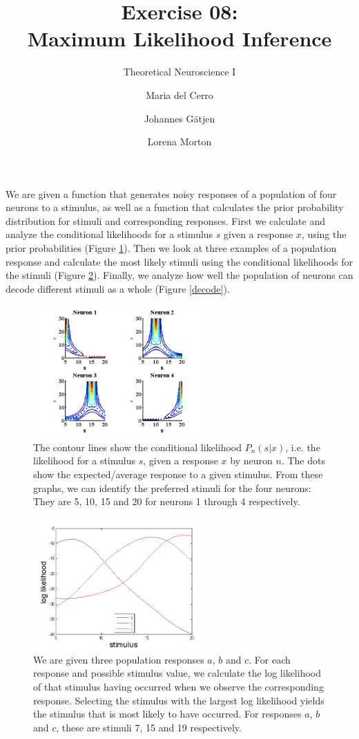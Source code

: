 \documentclass{scrartcl}
\title{Exercise 08:\\Maximum Likelihood Inference}
\subtitle{Theoretical Neuroscience I}
\author{Maria del Cerro \and Johannes G\"atjen \and Lorena Morton}
\begin{document}
\maketitle

We are given a function that generates noisy responses of a population of four neurons to a stimulus, as well as a function that calculates the prior probability distribution for stimuli and corresponding responses. First we calculate and analyze the conditional likelihoods for a stimulus $s$ given a response $x$, using the prior probabilities (Figure \ref{cond}). Then we look at three examples of a population response and calculate the most likely stimuli using the conditional likelihoods for the stimuli (Figure \ref{log_ll}). Finally, we analyze how well the population of neurons can decode different stimuli as a whole (Figure \ref{decode}).

\begin{figure}[h]
\centering
\includegraphics[trim = {1.3cm 0 2cm 0.3cm}, width=0.6\textwidth, clip]{../pics/cond_pdf}
\caption{The contour lines show the conditional likelihood $P_n(s|x)$, i.e. the likelihood for a stimulus $s$, given a response $x$ by neuron $n$. The dots show the expected/average response to a given stimulus. From these graphs, we can identify the preferred stimuli for the four neurons: They are 5, 10, 15 and 20 for neurons 1 through 4 respectively.}
\label{cond}
\end{figure}

\begin{figure}
\centering
\includegraphics[trim = {0.6cm 0 1.2cm 0.6cm}, width=0.6\textwidth, clip]{../pics/log_ll}
\caption{We are given three population responses $a$, $b$ and $c$. For each response and possible stimulus value, we calculate the log likelihood of that stimulus having occurred when we observe the corresponding response. Selecting the stimulus with the largest log likelihood yields the stimulus that is most likely to have occurred. For responses $a$, $b$ and $c$, these are stimuli 7, 15 and 19 respectively.}
\label{log_ll}
\end{figure}
\end{document}
